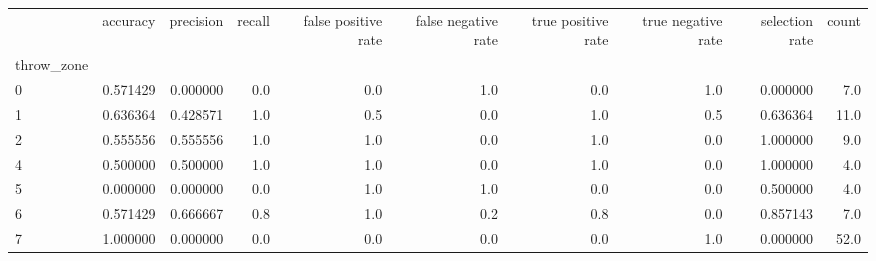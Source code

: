 \begin{tabular}{lrrrrrrrrr}
\toprule
{} &  accuracy &  precision &  recall &  false positive rate &  false negative rate &  true positive rate &  true negative rate &  selection rate &  count \\
throw\_zone &           &            &         &                      &                      &                     &                     &                 &        \\
\midrule
0          &  0.571429 &   0.000000 &     0.0 &                  0.0 &                  1.0 &                 0.0 &                 1.0 &        0.000000 &    7.0 \\
1          &  0.636364 &   0.428571 &     1.0 &                  0.5 &                  0.0 &                 1.0 &                 0.5 &        0.636364 &   11.0 \\
2          &  0.555556 &   0.555556 &     1.0 &                  1.0 &                  0.0 &                 1.0 &                 0.0 &        1.000000 &    9.0 \\
4          &  0.500000 &   0.500000 &     1.0 &                  1.0 &                  0.0 &                 1.0 &                 0.0 &        1.000000 &    4.0 \\
5          &  0.000000 &   0.000000 &     0.0 &                  1.0 &                  1.0 &                 0.0 &                 0.0 &        0.500000 &    4.0 \\
6          &  0.571429 &   0.666667 &     0.8 &                  1.0 &                  0.2 &                 0.8 &                 0.0 &        0.857143 &    7.0 \\
7          &  1.000000 &   0.000000 &     0.0 &                  0.0 &                  0.0 &                 0.0 &                 1.0 &        0.000000 &   52.0 \\
\bottomrule
\end{tabular}
